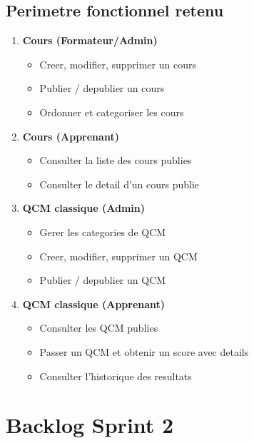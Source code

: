 \documentclass[a4paper,12pt]{report}
\begin{document}
\subsection{Perimetre fonctionnel retenu}

\begin{enumerate}
  \item \textbf{Cours (Formateur/Admin)}
  \begin{itemize}
    \item Creer, modifier, supprimer un cours
    \item Publier / depublier un cours
    \item Ordonner et categoriser les cours
  \end{itemize}
  \item \textbf{Cours (Apprenant)}
  \begin{itemize}
    \item Consulter la liste des cours publies
    \item Consulter le detail d'un cours publie
  \end{itemize}
  \item \textbf{QCM classique (Admin)}
  \begin{itemize}
    \item Gerer les categories de QCM
    \item Creer, modifier, supprimer un QCM
    \item Publier / depublier un QCM
  \end{itemize}
  \item \textbf{QCM classique (Apprenant)}
  \begin{itemize}
    \item Consulter les QCM publies
    \item Passer un QCM et obtenir un score avec details
    \item Consulter l'historique des resultats
  \end{itemize}
\end{enumerate}

\section{Backlog Sprint 2}
\end{document}
